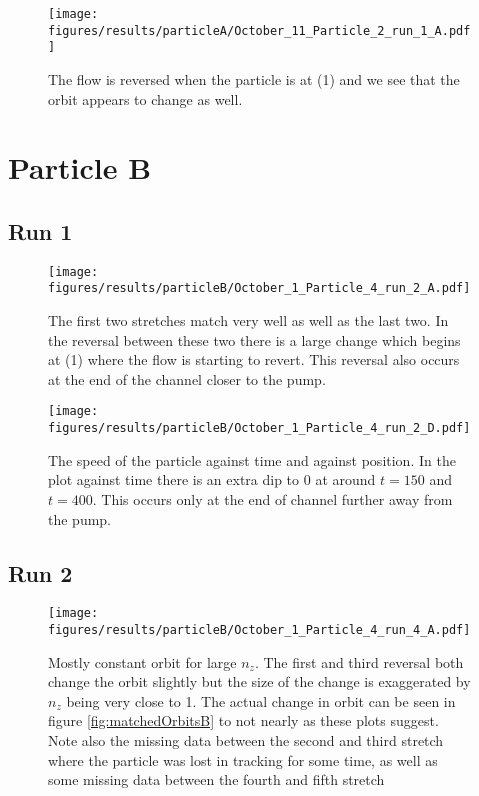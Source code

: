 \begin{figure}[H]
\begin{center}
\texttt{[image: figures/results/particleA/October\_11\_Particle\_2\_run\_1\_A.pdf]}
\end{center}
\caption{The flow is reversed when the particle is at (1) and we see that the orbit appears to change as well.}
\label{fig:particleA4}
\end{figure}




\section{Particle B}

\subsection{Run 1}
\begin{figure}[H]
\begin{center}
\texttt{[image: figures/results/particleB/October\_1\_Particle\_4\_run\_2\_A.pdf]}
\end{center}
\caption{The first two stretches match very well as well as the last two. In the reversal between these two there is a large change which begins at (1) where the flow is starting to revert. This reversal also occurs at the end of the channel closer to the pump.}
\label{fig:particleB1}
\end{figure}

\begin{figure}[H]
\begin{center}
\texttt{[image: figures/results/particleB/October\_1\_Particle\_4\_run\_2\_D.pdf]}
\end{center}
\caption{The speed of the particle against time and against position. In the plot against time there is an extra dip to 0 at around $t=150$ and $t=400$. This occurs only at the end of channel further away from the pump.}
\label{fig:particleB1speed}
\end{figure}

\subsection{Run 2}

\begin{figure}[H]
\begin{center}
\texttt{[image: figures/results/particleB/October\_1\_Particle\_4\_run\_4\_A.pdf]}
\end{center}
\caption{Mostly constant orbit for large $n_z$. The first and third reversal both change the orbit slightly but the size of the change is exaggerated by $n_z$ being very close to 1. The actual change in orbit can be seen in figure \ref{fig:matchedOrbitsB} to not nearly as these plots suggest. Note also the missing data between the second and third stretch where the particle was lost in tracking for some time, as well as some missing data between the fourth and fifth stretch}
\label{fig:particleB2}
\end{figure}


